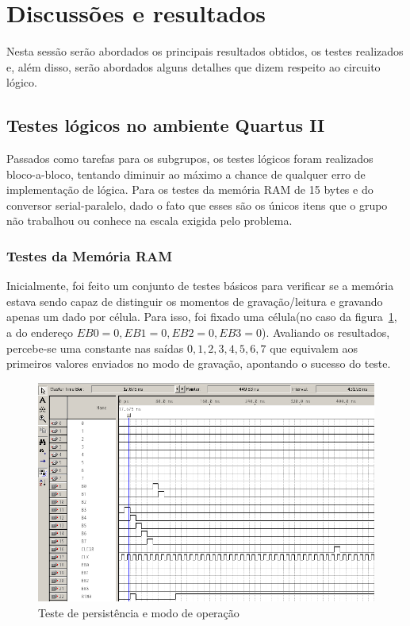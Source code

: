 \documentclass[12pt]{article}
\begin{document}
\section{Discussões e resultados}

Nesta sessão serão abordados os principais resultados obtidos, os testes realizados e, além disso, serão abordados alguns detalhes que dizem respeito ao circuito lógico.

\subsection{Testes lógicos no ambiente Quartus II}

Passados como tarefas para os subgrupos, os testes lógicos foram realizados bloco-a-bloco, tentando diminuir ao máximo a chance de qualquer erro de implementação de lógica. Para os testes da memória RAM de 15 bytes e do conversor serial-paralelo, dado o fato que esses são os únicos itens que o grupo não trabalhou ou conhece na escala exigida pelo problema.

\subsubsection{Testes da Memória RAM}

Inicialmente, foi feito um conjunto de testes básicos para verificar se a memória estava sendo capaz de distinguir os momentos de gravação/leitura e gravando apenas um dado por célula. Para isso, foi fixado uma célula(no caso da figura~\ref{fig:ramtest}, a do endereço $EB0=0, EB1=0, EB2=0, EB3=0$). Avaliando os resultados, percebe-se uma constante nas saídas $0,1,2,3,4,5,6,7$ que equivalem aos primeiros valores enviados no modo de gravação, apontando o sucesso do teste.

\begin{figure}[!htbp]
\centering
\includegraphics[width=1\textwidth]{img/p4/testram1.png}
\caption{Teste de persistência e modo de operação}
\label{fig:ramtest}
\end{figure}
\end{document}

